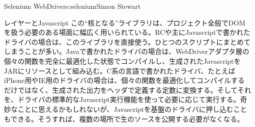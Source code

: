 \begin{aosachapter}{Selenium WebDriver}{s:selenium}{Simon Stewart}
\begin{aosasect1}{レイヤーとJavascript}
この``核となる''ライブラリは、プロジェクト全般でDOMを扱う必要のある場面に幅広く用いられている。RCや主にJavascriptで書かれたドライバの場合は、このライブラリを直接使う。ひとつのスクリプトにまとめてしまうことが多い。Javaで書かれたドライバの場合は、WebDriverアダプタ層の個々の関数を完全に最適化した状態でコンパイルし、生成されたJavascriptをJARにリソースとして組み込む。C系の言語で書かれたドライバ、たとえばiPhone用やIE用のドライバの場合は、個々の関数を最適化してコンパイルするだけではなく、生成された出力をヘッダで定義する定数に変換する。そしてそれを、ドライバの標準的なJavascript実行機能を使って必要に応じて実行する。奇妙なことに思えるかもしれないが、Javascriptを基盤のドライバに押し込むこともできる。そうすれば、複数の場所で生のソースを公開する必要がなくなる。


\end{aosasect1}
\end{aosachapter}
